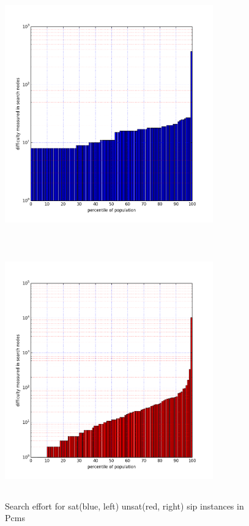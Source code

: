 \documentclass{l4proj}
\begin{document}
\begin{figure}
\centering
\begin{minipage}[t]{.5\textwidth}
  \centering
  \includegraphics[height=11cm,width=9cm]{images/plots/pcmsSAT.png}
\end{minipage}%
\begin{minipage}[t]{.5\textwidth}
  \centering
  \includegraphics[height=11cm,width=9cm]{images/plots/pcmsUNSAT.png}
\end{minipage}
\caption{Search effort for \gls{sat}(blue, left) \gls{unsat}(red, right) \gls{sip} instances in Pcms}
\label{fig:pcmsSatUnsat}
\end{figure}
\end{document}
